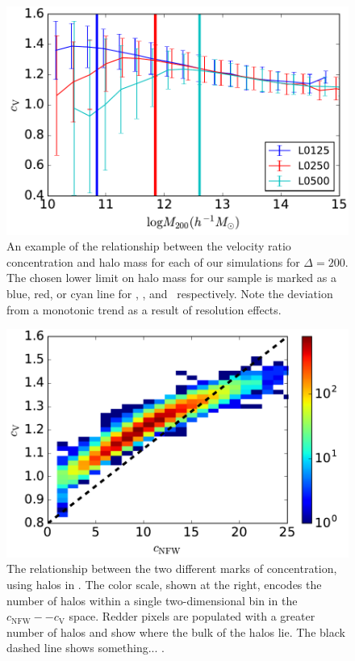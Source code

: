 \documentclass[usenatbib,usegraphicx,letterpaper]{mn2e}
\begin{document}
\begin{figure}
\centering
\includegraphics[width=.5\textwidth]{masscut_cV_d200.pdf}
\caption{An example of the relationship between the velocity ratio concentration and halo mass for each of our simulations for $\Delta =200$. The chosen lower limit on halo mass for our sample is marked as a blue, red, or cyan line for \simA, \simB, and \simC \ respectively. Note the deviation from a monotonic trend as a result of resolution effects. 
}
\label{fig:cvrelation}
\end{figure}

\begin{figure}
\centering
\includegraphics[width=.5\textwidth]{cvvscnfw_relation.pdf}
\caption{
The relationship between the two different marks of concentration, 
using halos in \simB. The color scale, shown at the right, encodes the number of halos 
within a single two-dimensional bin in the $c_{\mathrm{NFW}}--c_{\mathrm{V}}$ space. 
Redder pixels are populated with a greater number of halos and show where the bulk of the 
halos lie. The black dashed line shows something... . 
}
\label{fig:concentrations}
\end{figure}
\end{document}

